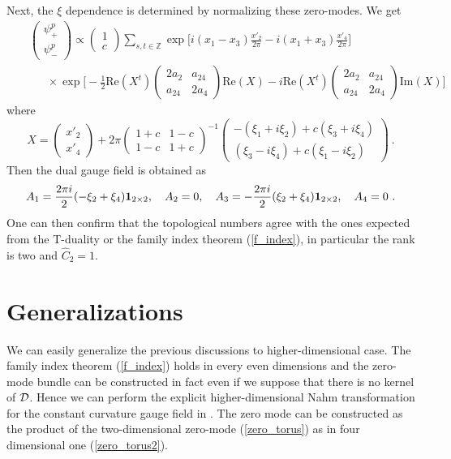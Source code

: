 \documentclass[a4paper,epsf,12pt]{article}
\newcommand{\Z}{{\mathbb{Z}}}
\newcommand{\bp}{\begin{pmatrix}}
\newcommand{\ep}{\end{pmatrix}}
\newcommand{\cD}{{\cal D}}
\newcommand{\cF}{{\cal F}}
\newcommand{\x}{\xi}
\newcommand{\bra}{\langle}
\newcommand{\ket}{\rangle}
\newcommand{\ot}{\otimes}
\newcommand{\fr}{\frac}
\newcommand{\nn}{\nonumber\\}
\newcommand{\Ch}{\hat{C}}
\newcommand{\whg}{\widehat{G}}
\def \cD{{\cal D}}
\def \Re{\mathrm{Re}}
\def \Im{\mathrm{Im}}
\def \ot#1{\otimes_{#1}}
\def \cF{{\cal F}}
\def \1{{\bf 1}}
\begin{document}
Next, the $\xi$ dependence is determined by 
normalizing these zero-modes.
We get
\begin{eqnarray*}
&& \bp \psi^p_+\\ \psi^p_- \ep
 \propto \bp 1 \\ c \ep
 \sum_{s,t\in\Z}
 \exp{\Big[i(x_1-x_3)
\frac{x'_2}{2\pi}
      -i(x_1+x_3)
\frac{x'_4}{2\pi}
\Big]}\nn
&&  ~~~~~~~\times
  \exp{\Big[-\frac{1}{2} \Re(X^t)\bp 2a_2 & a_{24}\\ a_{24} & 2a_4\ep \Re(X)
  -i\Re(X^t)\bp 2a_2 & a_{24}\\ a_{24} & 2a_4\ep \Im(X)\Big]}
\end{eqnarray*}
where 
\begin{equation*}
 X=\bp x'_2
\\x'_4
\ep
  +2\pi
 \bp 1+c & 1-c\\ 1-c & 1+c \ep^{-1}
 \bp -(\xi_1+i\xi_2)+c(\xi_3+i\xi_4)\\ 
     (\xi_3-i\xi_4)+c(\xi_1-i\xi_2)\ep\ .
\end{equation*}
Then the dual gauge field is obtained as 
\begin{equation*}
 A_1=\frac{2\pi i}{2}(-\xi_2+\xi_4)\1_{2\times 2},~~~A_2=0,~~~
A_3=-\frac{2\pi i}{2}(\xi_2+\xi_4)\1_{2\times 2},~~~A_4=0\ .
\end{equation*}
One can then confirm that the topological numbers agree with the 
ones expected from the T-duality or the family index theorem (\ref{f_index}), 
in particular the rank is two and $\Ch_2=1$. 



\section{Generalizations}


We can easily generalize the previous discussions to
higher-dimensional case.
The family index theorem (\ref{f_index}) holds in every even dimensions
and the zero-mode bundle can be constructed in fact even if we 
suppose that there is no kernel of $\cD$.
Hence we can perform the explicit
higher-dimensional Nahm transformation for the constant
curvature gauge field in \cite{Taylor, Troost}.
The zero mode can be constructed as the product of the
two-dimensional zero-mode (\ref{zero_torus}) 
as in four dimensional one (\ref{zero_torus2}).
\end{document}
